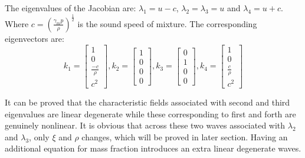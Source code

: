 The eigenvalues of the Jacobian are: $\lambda_1 = u-c$,  $\lambda_2 = \lambda_3 = u$ and $\lambda_4 = u+c$. Where $c=(\frac{\gamma_m p}{\rho})^{\frac{1}{2}}$ is the sound speed of mixture. The corresponding eigenvectors are: 
\begin{equation}
   k_1 =\begin{bmatrix}
         1 \\
         0 \\
         \frac{-c}{\rho} \\
         c^2
     \end{bmatrix},
   k_2 =\begin{bmatrix}
         1 \\
         0 \\
         0   \\
         0
     \end{bmatrix},
   k_3 =\begin{bmatrix}
         0 \\
         1 \\
         0   \\
         0
     \end{bmatrix},
   k_4 =\begin{bmatrix}
         1 \\
         0 \\
         \frac{c}{\rho} \\
         c^2
     \end{bmatrix}
     \label{eq:eigenvector-pressure}
\end{equation}

It can be proved that the characteristic fields associated with second and third eigenvalues are linear degenerate while these corresponding to first and forth are genuinely nonlinear. It is obvious that across these two waves associated with $\lambda_2$ and $\lambda_3$, only $\xi$ and $\rho$ changes, which will be proved in later section. Having an additional equation for mass fraction introduces an extra linear degenerate waves.

